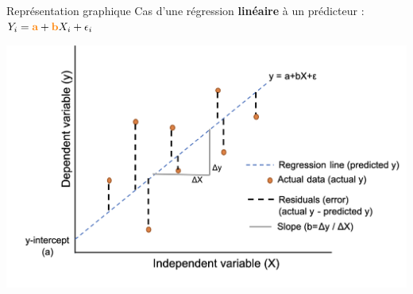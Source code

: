 	
	\begin{frame}{Représentation graphique}
	Cas d'une régression \textbf{linéaire} à un prédicteur : $Y_i = \textcolor{orange}{\textbf{a}} + \textcolor{orange}{\textbf{b}}X_i + \epsilon_i$
	
	\vspace{0.5cm}
	\includegraphics[scale=0.275]{Figures/Intro/regressionLine.png}
	\end{frame}
	
